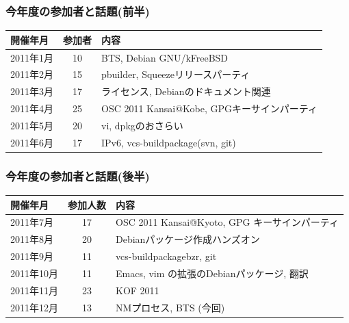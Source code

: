 \documentclass[cjk,dvipdfmx,10pt,%
hyperref={bookmarks=true,bookmarksnumbered=true,bookmarksopen=false,%
colorlinks=false,%
pdftitle={第 54 回 関西 Debian 勉強会},%
pdfauthor={倉敷・のがた・佐々木},%
pdfsubject={資料},%
}]{beamer}
\begin{document}
\begin{frame}[fragile]
  \frametitle{今年度の参加者と話題(前半)}
  \begin{tabular}{|l|c|p{18em}|}
    \hline
    開催年月  & 参加者   & 内容                                                 \\
    \hline
    2011年1月 &10        & BTS, Debian GNU/kFreeBSD                             \\
    2011年2月 &15        & pbuilder, Squeezeリリースパーティ                    \\
    2011年3月 &17        & ライセンス, Debianのドキュメント関連                 \\
    2011年4月 &25        & OSC 2011 Kansai@Kobe, \newline GPGキーサインパーティ \\
    2011年5月 &20        & vi, dpkgのおさらい                                   \\
    2011年6月 &17        & IPv6, vcs-buildpackage(svn, git)                     \\
    \hline
  \end{tabular}
\end{frame}
\begin{frame}[fragile]
  \frametitle{今年度の参加者と話題(後半)}
  \begin{tabular}{|l|c|p{18em}|}
    \hline
    開催年月  & 参加人数 & 内容                                                  \\
    \hline
    2011年7月 &17        & OSC 2011 Kansai@Kyoto, \newline GPG キーサインパーティ\\
    2011年8月 &20        & Debianパッケージ作成ハンズオン                        \\
    2011年9月 &11        & vcs-buildpackage{bzr, git}                            \\
    2011年10月&11        & Emacs, vim の拡張のDebianパッケージ, 翻訳             \\
    2011年11月&23        & KOF 2011                                              \\
    2011年12月&13        & NMプロセス, BTS (今回)                                \\
    \hline
  \end{tabular}
\end{frame}
\end{document}
